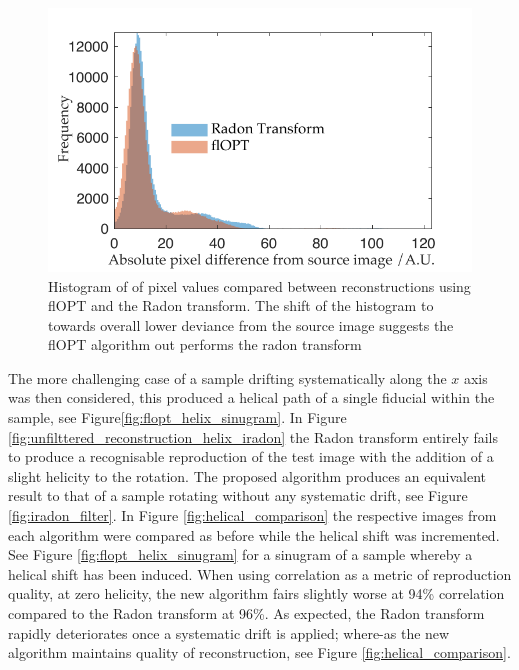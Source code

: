 \begin{figure}
  \centering
  \includegraphics{Chapters/flopt/Figs/PDF/results/flopt_histogram}
  \caption{Histogram of of pixel values compared between reconstructions using flOPT and the Radon transform.
  The shift of the histogram to towards overall lower deviance from the source image suggests the flOPT algorithm out performs the radon transform}
  \label{fig:flopt_histogram}
\end{figure}


The more challenging case of a sample drifting systematically along the $x$ axis was then considered, this produced a helical path of a single fiducial within the sample, see Figure\ref{fig:flopt_helix_sinugram}.
In Figure \ref{fig:unfilttered_reconstruction_helix_iradon} the Radon transform entirely fails to produce a recognisable reproduction of the test image with the addition of a slight helicity to the rotation.
The proposed algorithm produces an equivalent result to that of a sample rotating without any systematic drift, see Figure \ref{fig:iradon_filter}.
In Figure \ref{fig:helical_comparison} the respective images from each algorithm were compared as before while the helical shift was incremented.
See Figure \ref{fig:flopt_helix_sinugram} for a sinugram of a sample whereby a helical shift has been induced.
When using correlation as a metric of reproduction quality, at zero helicity, the new algorithm fairs slightly worse at 94\% correlation compared to the Radon transform at 96\%.
As expected, the Radon transform rapidly deteriorates once a systematic drift is applied; where-as the new algorithm maintains quality of reconstruction, see Figure \ref{fig:helical_comparison}.


